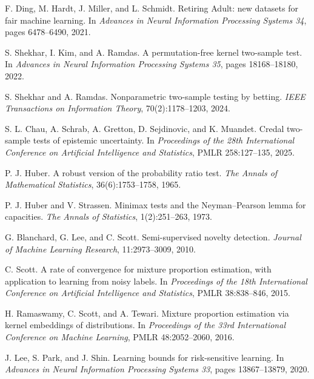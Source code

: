 F. Ding, M. Hardt, J. Miller, and L. Schmidt.
\newblock Retiring Adult: new datasets for fair machine learning.
\newblock In \emph{Advances in Neural Information Processing Systems 34}, pages 6478--6490, 2021.

S. Shekhar, I. Kim, and A. Ramdas.
\newblock A permutation-free kernel two-sample test.
\newblock In \emph{Advances in Neural Information Processing Systems 35}, pages 18168--18180, 2022.

S. Shekhar and A. Ramdas.
\newblock Nonparametric two-sample testing by betting.
\newblock \emph{IEEE Transactions on Information Theory}, 70(2):1178--1203, 2024.

S. L. Chau, A. Schrab, A. Gretton, D. Sejdinovic, and K. Muandet.
\newblock Credal two-sample tests of epistemic uncertainty.
\newblock In \emph{Proceedings of the 28th International Conference on Artificial Intelligence and Statistics}, PMLR 258:127--135, 2025.

P. J. Huber.
\newblock A robust version of the probability ratio test.
\newblock \emph{The Annals of Mathematical Statistics}, 36(6):1753--1758, 1965.

P. J. Huber and V. Strassen.
\newblock Minimax tests and the Neyman--Pearson lemma for capacities.
\newblock \emph{The Annals of Statistics}, 1(2):251--263, 1973.


G. Blanchard, G. Lee, and C. Scott.
\newblock Semi-supervised novelty detection.
\newblock \emph{Journal of Machine Learning Research}, 11:2973--3009, 2010.

C. Scott.
\newblock A rate of convergence for mixture proportion estimation, with application to learning from noisy labels.
\newblock In \emph{Proceedings of the 18th International Conference on Artificial Intelligence and Statistics}, PMLR 38:838--846, 2015.

H. Ramaswamy, C. Scott, and A. Tewari.
\newblock Mixture proportion estimation via kernel embeddings of distributions.
\newblock In \emph{Proceedings of the 33rd International Conference on Machine Learning}, PMLR 48:2052--2060, 2016.

J. Lee, S. Park, and J. Shin.
\newblock Learning bounds for risk-sensitive learning.
\newblock In \emph{Advances in Neural Information Processing Systems 33}, pages 13867--13879, 2020.


